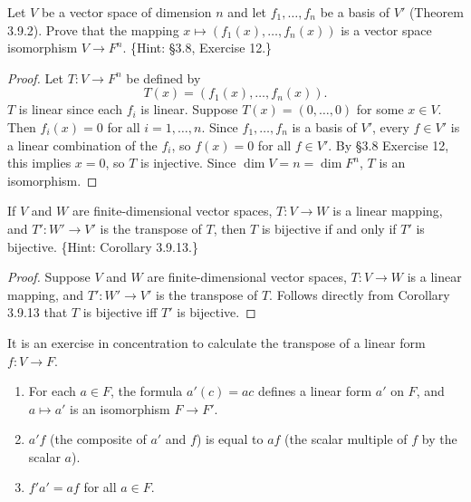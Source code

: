\begin{tcolorbox}[title=Exercise 6, breakable]
    Let $V$ be a vector space of dimension $n$ and let $f_1, \ldots, f_n$ be a basis of 
    $V'$ (Theorem 3.9.2). Prove that the mapping $x \mapsto (f_1(x), \ldots, f_n(x))$ is a 
    vector space isomorphism $V \to F^n$. \{Hint: \S 3.8, Exercise 12.\}
\end{tcolorbox}

\begin{proof}
    Let $T: V \to F^n$ be defined by
    \[T(x) = (f_1(x), \ldots, f_n(x)).\]
    $T$ is linear since each $f_i$ is linear.
    Suppose $T(x) = (0, \ldots, 0)$ for some $x \in V$.
    Then $f_i(x) = 0$ for all $i = 1, \ldots, n$.
    Since $f_1, \ldots, f_n$ is a basis of $V'$, every $f \in V'$ is a linear combination 
    of the $f_i$, so $f(x) = 0$ for all $f \in V'$.
    By \S 3.8 Exercise 12, this implies $x = 0$, so $T$ is injective.
    Since $\dim V = n = \dim F^n$, $T$ is an isomorphism.
\end{proof}

\begin{tcolorbox}[title=Exercise 7, breakable]
    If $V$ and $W$ are finite-dimensional vector spaces, $T : V \to W$ is a linear 
    mapping, and $T' : W' \to V'$ is the transpose of $T$, then $T$ is bijective if 
    and only if $T'$ is bijective. \{Hint: Corollary 3.9.13.\}
\end{tcolorbox}

\begin{proof}
    Suppose $V$ and $W$ are finite-dimensional vector spaces, $T : V \to W$ is a linear 
    mapping, and $T' : W' \to V'$ is the transpose of $T$.
    Follows directly from Corollary 3.9.13 that $T$ is bijective iff $T'$ is bijective.
\end{proof}

\begin{tcolorbox}[title=Exercise 8, breakable]
    It is an exercise in concentration to calculate the transpose of a linear 
    form $f : V \to F$.
    \begin{enumerate}
        \item[(i)] For each $a \in F$, the formula $a'(c) = ac$ defines a linear form $a'$ on 
        $F$, and $a \mapsto a'$ is an isomorphism $F \to F'$.
        \item[(ii)] $a'f$ (the composite of $a'$ and $f$) is equal to $af$ (the scalar multiple 
        of $f$ by the scalar $a$).
        \item[(iii)] $f'a' = af$ for all $a \in F$.
    \end{enumerate}
\end{tcolorbox}

